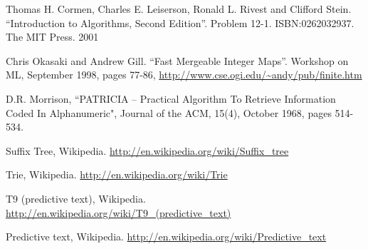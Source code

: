 \documentclass{article}
\begin{document}
\begin{thebibliography}{99}

Thomas H. Cormen, Charles E. Leiserson, Ronald L. Rivest and Clifford Stein.
``Introduction to Algorithms, Second Edition''. Problem 12-1. ISBN:0262032937. The MIT Press. 2001

Chris Okasaki and Andrew Gill. ``Fast Mergeable Integer
Maps''. Workshop on ML, September 1998, pages 77-86, \url{http://www.cse.ogi.edu/~andy/pub/finite.htm}

D.R. Morrison, ``PATRICIA -- Practical Algorithm To Retrieve  Information Coded In Alphanumeric", Journal of the ACM, 15(4), October 1968, pages 514-534.

Suffix Tree, Wikipedia. \url{http://en.wikipedia.org/wiki/Suffix_tree}

Trie, Wikipedia. \url{http://en.wikipedia.org/wiki/Trie}

T9 (predictive text), Wikipedia. \url{http://en.wikipedia.org/wiki/T9_(predictive_text)}

Predictive text,
Wikipedia. \url{http://en.wikipedia.org/wiki/Predictive_text}

\end{thebibliography}

\ifx\wholebook\relax\else
\end{document}
